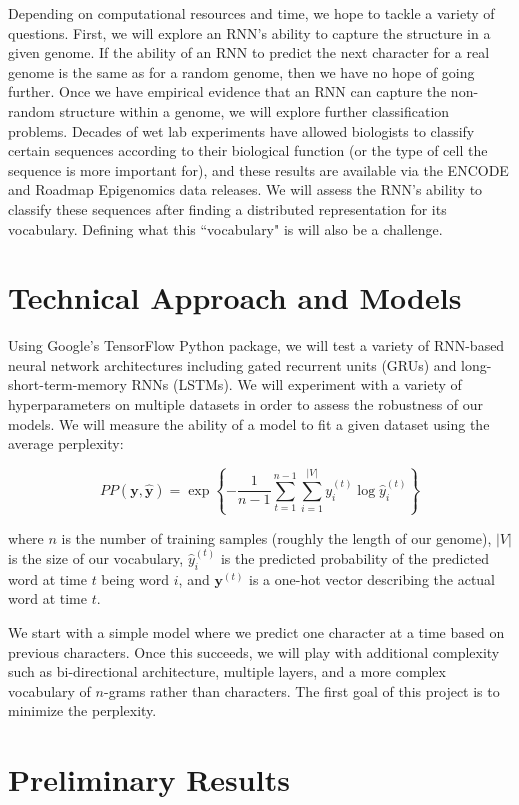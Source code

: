 \documentclass{article} %
\begin{document}
Depending on computational resources and time, we hope to tackle a variety of questions. First, we will explore an RNN's ability to capture the structure in a given genome. If the ability of an RNN to predict the next character for a real genome is the same as for a random genome, then we have no hope of going further. Once we have empirical evidence that an RNN can capture the non-random structure within a genome, we will explore further classification problems. Decades of wet lab experiments have allowed biologists to classify certain sequences according to their biological function (or the type of cell the sequence is more important for), and these results are available via the ENCODE and Roadmap Epigenomics data releases. We will assess the RNN's ability to classify these sequences after finding a distributed representation for its vocabulary. Defining what this ``vocabulary" is will also be a challenge.

\section{Technical Approach and Models}

Using Google's TensorFlow Python package, we will test a variety of RNN-based neural network architectures including gated recurrent units (GRUs) and long-short-term-memory RNNs (LSTMs). We will experiment with a variety of hyperparameters on multiple datasets in order to assess the robustness of our models. We will measure the ability of a model to fit a given dataset using the average perplexity:

$$
	PP(\mathbf{y},\mathbf{\hat{y}}) = \exp \left\{-\frac{1}{n-1} \sum_{t=1}^{n-1} \sum_{i=1}^{|V|} y_i^{(t)} \log \hat{y}_i^{(t)}\right\}
$$

where $n$ is the number of training samples (roughly the length of our genome), $|V|$ is the size of our vocabulary, $\hat{y}^{(t)}_i$ is the predicted probability of the predicted word at time $t$ being word $i$, and $\mathbf{y}^{(t)}$ is a one-hot vector describing the actual word at time $t$.

We start with a simple model where we predict one character at a time based on previous characters. Once this succeeds, we will play with additional complexity such as bi-directional architecture, multiple layers, and a more complex vocabulary of $n$-grams rather than characters. The first goal of this project is to minimize the perplexity. 

\section{Preliminary Results}
\end{document}
